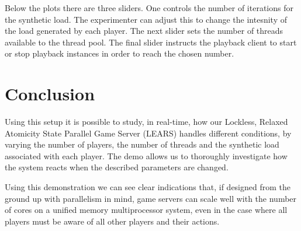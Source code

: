 Below the plots there are three sliders. One controls the number of
iterations for the synthetic load. The experimenter can adjust this to
change the intesnity of the load generated by each player. The next
slider sets the number of threads available to the thread pool. The
final slider instructs the playback client to start or stop playback
instances in order to reach the chosen number.

\section{Conclusion}
Using this setup it is possible to study, in real-time, how our
Lockless, Relaxed Atomicity State Parallel Game Server (LEARS) handles
different conditions, by varying the number of players, the number of threads and the synthetic load associated with each player.
The demo allows us to thoroughly investigate how the system reacts when the described parameters are changed.

Using this demonstration we can see clear indications that, if designed from the ground up with
parallelism in mind, game servers can scale well with the number of
cores on a unified memory multiprocessor system, even in the case
where all players must be aware of all other players and their
actions.
